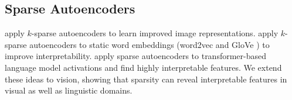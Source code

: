 \subsection{Sparse Autoencoders}

\citet{makhzani2013k,makhzani2015winner} apply $k$-sparse autoencoders to learn improved image representations.
\citet{subramanian2018spine} apply $k$-sparse autoencoders to static word embeddings (word2vec \citep{mikolov2013word2vec} and GloVe \citep{pennington2014glove}) to improve interpretability.
\citet{zhang2019word,yun2021transformer,bricken2023monosemanticity,templeton2024scaling,gao2024scaling} apply sparse autoencoders to transformer-based language model activations and find highly interpretable features.
We extend these ideas to vision, showing that sparsity can reveal interpretable features in visual as well as linguistic domains.

